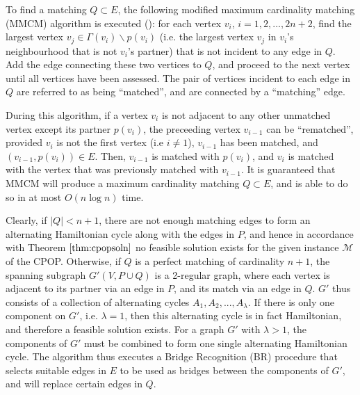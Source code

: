\documentclass[oribibl]{llncs}
\begin{document}
To find a matching $Q \subset E$, the following modified maximum cardinality matching (MMCM) algorithm is executed (\citealp{mahadev1994, becker2010}): for each vertex $v_i$, $i = 1, 2,...,2n+2$, find the largest vertex $v_j \in \Gamma(v_i)\backslash p(v_i)$ (i.e. the largest vertex $v_j$ in $v_i$'s neighbourhood that is not $v_i$'s partner) that is not incident to any edge in $Q$. Add the edge connecting these two vertices to $Q$, and proceed to the next vertex until all vertices have been assessed. The pair of vertices incident to each edge in $Q$ are referred to as being ``matched'', and are connected by a ``matching'' edge. 

During this algorithm, if a vertex $v_i$ is not adjacent to any other unmatched vertex except its partner $p(v_i)$, the preceeding vertex $v_{i-1}$ can be ``rematched'', provided $v_i$ is not the first vertex (i.e $i \neq 1$), $v_{i-1}$ has been matched, and $(v_{i-1}, p(v_i)) \in E$. Then, $v_{i-1}$ is matched with $p(v_i)$, and $v_i$ is matched with the vertex that was previously matched with $v_{i-1}$. It is guaranteed that MMCM will produce a maximum cardinality matching $Q \subset E$, and is able to do so in at most $O(n \log n)$ time.

Clearly, if $|Q| < n+1$, there are not enough matching edges to form an alternating Hamiltonian cycle along with the edges in $P$, and hence in accordance with Theorem $\ref{thm:cpopsoln}$ no feasible solution exists for the given instance $\mathcal{M}$ of the CPOP. Otherwise, if $Q$ is a perfect matching of cardinality $n+1$, the spanning subgraph $G'(V, P \cup Q)$ is a 2-regular graph, where each vertex is adjacent to its partner via an edge in $P$, and its match via an edge in $Q$. $G'$ thus consists of a collection of alternating cycles $A_1, A_2, ..., A_{\lambda}$. If there is only one component on $G'$, i.e. $\lambda = 1$, then this alternating cycle is in fact Hamiltonian, and therefore a feasible solution exists. For a graph $G'$ with $\lambda > 1$, the components of $G'$ must be combined to form one single alternating Hamiltonian cycle. The algorithm thus executes a Bridge Recognition (BR) procedure that selects suitable edges in $E$ to be used as bridges between the components of $G'$, and will replace certain edges in $Q$.
\end{document}
